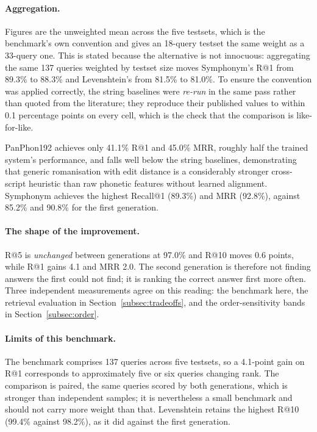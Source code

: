 \documentclass[11pt,a4paper]{article}
\begin{document}
\paragraph{Aggregation.} Figures are the unweighted mean across the five testsets, which is the benchmark's own convention and gives an 18-query testset the same weight as a 33-query one. This is stated because the alternative is not innocuous: aggregating the same 137 queries weighted by testset size moves Symphonym's R@1 from 89.3\% to 88.3\% and Levenshtein's from 81.5\% to 81.0\%. To ensure the convention was applied correctly, the string baselines were \emph{re-run} in the same pass rather than quoted from the literature; they reproduce their published values to within 0.1 percentage points on every cell, which is the check that the comparison is like-for-like.

PanPhon192 achieves only 41.1\% R@1 and 45.0\% MRR, roughly half the trained system's performance, and falls well below the string baselines, demonstrating that generic romanisation with edit distance is a considerably stronger cross-script heuristic than raw phonetic features without learned alignment. Symphonym achieves the highest Recall@1 (89.3\%) and MRR (92.8\%), against 85.2\% and 90.8\% for the first generation.

\paragraph{The shape of the improvement.} R@5 is \emph{unchanged} between generations at 97.0\% and R@10 moves 0.6 points, while R@1 gains 4.1 and MRR 2.0. The second generation is therefore not finding answers the first could not find; it is ranking the correct answer first more often. Three independent measurements agree on this reading: the benchmark here, the retrieval evaluation in Section~\ref{subsec:tradeoffs}, and the order-sensitivity bands in Section~\ref{subsec:order}.

\paragraph{Limits of this benchmark.} The benchmark comprises 137 queries across five testsets, so a 4.1-point gain on R@1 corresponds to approximately five or six queries changing rank. The comparison is paired, the same queries scored by both generations, which is stronger than independent samples; it is nevertheless a small benchmark and should not carry more weight than that. Levenshtein retains the highest R@10 (99.4\% against 98.2\%), as it did against the first generation.
\end{document}
